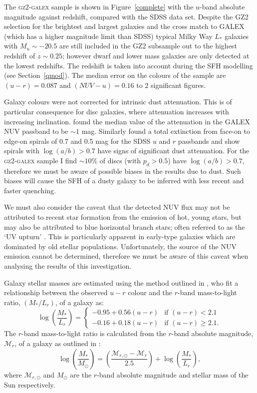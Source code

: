 The \textsc{gz2-galex} sample is shown in Figure~\ref{complete} with the $u$-band absolute magnitude against redshift, compared with the SDSS data set. Despite the GZ2 selection for the brightest and largest galaxies and the cross match to GALEX (which has a higher magnitude limit than SDSS) typical Milky Way $L_*$ galaxies with $M_u \sim -20.5$ are still included in the GZ2 subsample out to the highest redshift of $z \sim 0.25$; however dwarf and lower mass galaxies are only detected at the lowest redshifts. The redshift is taken into account during the SFH modelling (see Section~\ref{qmod}). {\minor The median error on the colours of the sample are $(u-r) = 0.087$ and $(NUV-u)=0.16$ to $2$ significant figures.} 

Galaxy colours were not corrected for intrinsic dust attenuation. This is of particular consequence for disc galaxies, where attenuation increases with increasing inclination. \cite{Buat05} found the median value of the attenuation in the GALEX NUV passband to be $\sim 1$ mag. Similarly \cite{masters10a} found a total extinction from face-on to edge-on spirals of 0.7 and 0.5 mag for the SDSS $u$ and $r$ passbands and show spirals with $\log(a/b) > 0.7$ have signs of significant dust attenuation. For the \textsc{gz2-galex} sample I find $\sim10\%$ of discs (with $p_d > 0.5$) have $\log(a/b) > 0.7$, therefore we must be aware of possible biases in the results due to dust. Such biases will cause the SFH of a dusty galaxy to be inferred with less recent and faster quenching. 

{\minor We must also consider the caveat that the detected NUV flux may not be attributed to recent star formation from the emission of hot, young stars, but may also be attributed to blue horizontal branch stars; often referred to as the `UV upturn' \citep{schombert16}. This is particularly apparent in early-type galaxies which are dominated by old stellar populations. Unfortunately, the source of the NUV emission cannot be determined, therefore we must be aware of this caveat when analysing the results of this investigation.}

Galaxy stellar masses are estimated using the method outlined in \cite{Baldry06}, who  fit a relationship between the observed $u-r$ colour and the $r$-band mass-to-light ratio, $(M_*/L_r)$, of a galaxy as:
\begin{equation}\label{baldrymlur}
\log\left(\frac{M_*}{L_r}\right) =
\begin{cases}
-0.95 + 0.56(u-r) & \text{if } (u-r) < 2.1 \\
-0.16 + 0.18(u-r) & \text{if } (u-r) \geq 2.1. 
\end{cases}
\end{equation}
The $r$-band mass-to-light ratio is calculated from the $r$-band absolute magnitude, $\mathcal{M}_r$, of a galaxy as outlined in \cite{blanton01}:
\begin{equation}\label{blanton}
\log\left(\frac{M_*}{M_{\odot}}\right) = \left(\frac{\mathcal{M}_{r,\odot} - \mathcal{M}_r}{2.5}\right) + \log\left(\frac{M_*}{L_r}\right),
\end{equation}
where $\mathcal{M}_{r,\odot}$ and $M_{\odot}$ are the $r$-band absolute magnitude and stellar mass of the Sun respectively. 


